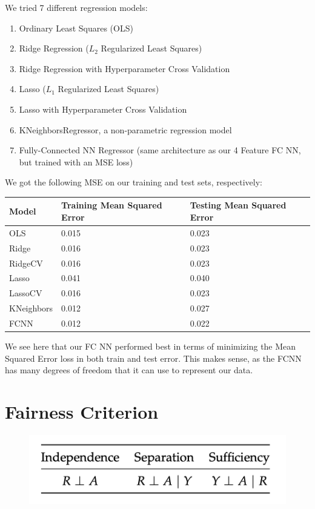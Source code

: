 \documentclass{article}
\begin{document}
We tried 7 different regression models: 
\begin{enumerate}
    \item Ordinary Least Squares (OLS)
    \item Ridge Regression ($L_2$ Regularized Least Squares)
    \item Ridge Regression with Hyperparameter Cross Validation
    \item Lasso ($L_1$ Regularized Least Squares)
    \item Lasso with Hyperparameter Cross Validation
    \item KNeighborsRegressor, a non-parametric regression model
    \item Fully-Connected NN Regressor (same architecture as our 4 Feature FC NN, but trained with an MSE loss)
\end{enumerate}

We got the following MSE on our training and test sets, respectively:

\begin{tabular}{lll}
\toprule
Model &   Training Mean Squared Error &   Testing Mean Squared Error\\
\midrule
OLS & 0.015 & 0.023 \\
Ridge & 0.016 & 0.023 \\
RidgeCV & 0.016 & 0.023 \\
Lasso & 0.041 & 0.040 \\
LassoCV & 0.016 & 0.023 \\
KNeighbors & 0.012 & 0.027 \\
FCNN & 0.012 & 0.022 \\
\bottomrule
\end{tabular}

We see here that our FC NN performed best in terms of minimizing the Mean Squared Error loss in both train and test error. This makes sense, as the FCNN has many degrees of freedom that it can use to represent our data.

\section{Fairness Criterion}

\begin{figure}[htb]%
    \centering
    {{\includegraphics[scale=0.4]{FairnessCriterion} }}%
    \label{fig:example}%
\end{figure}
\end{document}

